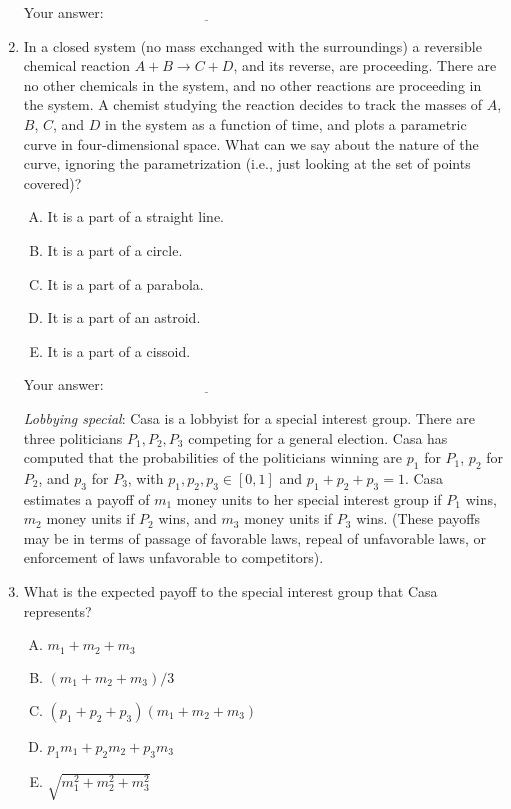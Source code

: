 \documentclass[10pt]{amsart}
\begin{document}
\begin{enumerate}
  \vspace{0.1in}
  Your answer: $\underline{\qquad\qquad\qquad\qquad\qquad\qquad\qquad}$
  \vspace{0.1in}

\item In a closed system (no mass exchanged with the surroundings) a
  reversible chemical reaction $A + B \to C + D$, and its reverse, are
  proceeding. There are no other chemicals in the system, and no other
  reactions are proceeding in the system. A chemist studying the
  reaction decides to track the masses of $A$, $B$, $C$, and $D$ in
  the system as a function of time, and plots a parametric curve in
  four-dimensional space. What can we say about the nature of the
  curve, ignoring the parametrization (i.e., just looking at the set
  of points covered)?


  \begin{enumerate}[(A)]
  \item It is a part of a straight line.
  \item It is a part of a circle.
  \item It is a part of a parabola.
  \item It is a part of an astroid.
  \item It is a part of a cissoid.
  \end{enumerate}

  \vspace{0.1in}
  Your answer: $\underline{\qquad\qquad\qquad\qquad\qquad\qquad\qquad}$
  \vspace{0.1in}

  {\em Lobbying special}: Casa is a lobbyist for a special interest
  group. There are three politicians $P_1,P_2,P_3$ competing for a
  general election. Casa has computed that the probabilities of the
  politicians winning are $p_1$ for $P_1$, $p_2$ for $P_2$, and $p_3$
  for $P_3$, with $p_1,p_2,p_3 \in [0,1]$ and $p_1 + p_2 + p_3 =
  1$. Casa estimates a payoff of $m_1$ money units to her special
  interest group if $P_1$ wins, $m_2$ money units if $P_2$ wins, and
  $m_3$ money units if $P_3$ wins. (These payoffs may be in terms of
  passage of favorable laws, repeal of unfavorable laws, or
  enforcement of laws unfavorable to competitors).

\item What is the expected payoff to the special interest group that
  Casa represents?

  \begin{enumerate}[(A)]
  \item $m_1 + m_2 + m_3$
  \item $(m_1 + m_2 + m_3)/3$
  \item $(p_1 + p_2 + p_3)(m_1 + m_2 + m_3)$
  \item $p_1m_1 + p_2m_2 + p_3m_3$
  \item $\sqrt{m_1^2 + m_2^2 + m_3^2}$
  \end{enumerate}


\end{enumerate}
\end{document}
